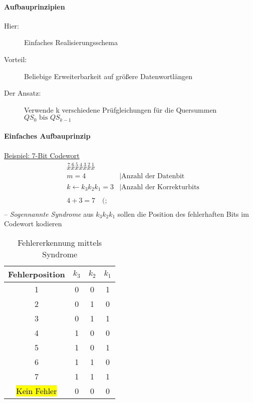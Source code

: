 \documentclass[a4paper]{scrartcl}
\begin{document}
					\paragraph{Aufbauprinzipien}
						\begin{description}
							\item[Hier:] Einfaches Realisierungsschema
							\item[Vorteil:] Beliebige Erweiterbarkeit auf größere Datenwortlängen
							\item[Der Ansatz:] Verwende k verschiedene Prüfgleichungen für die Quersummen \( QS_0 \text{ bis } QS_{k-1} \)
						\end{description}
					
					\paragraph{Einfaches Aufbauprinzip}
					\ul{Beispiel: 7-Bit Codewort}  \\
					 \begin{align*}
					 	 &\overset{7}{x} \overset{6}{x} \overset{5}{x} \overset{4}{x} \overset{3}{x} \overset{2}{x} \overset{1}{x}\\
					 	&m = 4 &| \text{Anzahl der Datenbit}\\
					 	&k \gets k_3 k_2 k_1 = 3 &| \text{Anzahl der Korrekturbits} \\
					 	\\
					 	&4 + 3 = 7 \quad (;\\
					 \end{align*}
					 -- \emph{Sogennannte Syndrome} aus \( k_3 k_2 k_1 \) sollen die Position des fehlerhaften Bits im Codewort kodieren\\ 
					
					\begin{table}[H]
						\centering
						\begin{tabular}{c | c c c }
							Fehlerposition	&\(k_3\) &\(k_2\) & \(k_1\) \\ \hline
							1& 0 & 0 &1\\
							2 &0&1&0\\
							3 &0&1&1\\
							4 &1&0&0\\
							5 &1&0&1\\
							6 &1&1&0\\
							7 &1&1&1\\
							\hl{Kein Fehler}&0&0&0
						\end{tabular}
						\caption{Fehlererkennung mittels Syndrome}
					\end{table}
					
\end{document}
